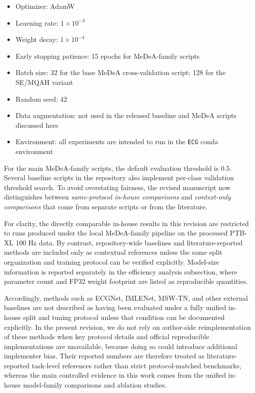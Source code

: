 \documentclass[11pt]{article}
\begin{document}
\begin{itemize}
    \item Optimizer: AdamW
    \item Learning rate: $1 \times 10^{-3}$
    \item Weight decay: $1 \times 10^{-4}$
    \item Early stopping patience: 15 epochs for MeDeA-family scripts
    \item Batch size: 32 for the base MeDeA cross-validation script; 128 for the SE/MQAH variant
    \item Random seed: 42
    \item Data augmentation: not used in the released baseline and MeDeA scripts discussed here
    \item Environment: all experiments are intended to run in the \texttt{ECG} conda environment
\end{itemize}

For the main MeDeA-family scripts, the default evaluation threshold is $0.5$. Several baseline scripts in the repository also implement per-class validation threshold search. To avoid overstating fairness, the revised manuscript now distinguishes between \emph{same-protocol in-house comparisons} and \emph{context-only comparisons} that come from separate scripts or from the literature.

For clarity, the directly comparable in-house results in this revision are restricted to runs produced under the local MeDeA-family pipeline on the processed PTB-XL 100 Hz data. By contrast, repository-wide baselines and literature-reported methods are included only as contextual references unless the same split organization and training protocol can be verified explicitly. Model-size information is reported separately in the efficiency analysis subsection, where parameter count and FP32 weight footprint are listed as reproducible quantities.

Accordingly, methods such as ECGNet, IMLENet, MSW-TN, and other external baselines are not described as having been evaluated under a fully unified in-house split and tuning protocol unless that condition can be documented explicitly. In the present revision, we do not rely on author-side reimplementation of these methods when key protocol details and official reproducible implementations are unavailable, because doing so could introduce additional implementer bias. Their reported numbers are therefore treated as literature-reported task-level references rather than strict protocol-matched benchmarks, whereas the main controlled evidence in this work comes from the unified in-house model-family comparisons and ablation studies.
\end{document}
